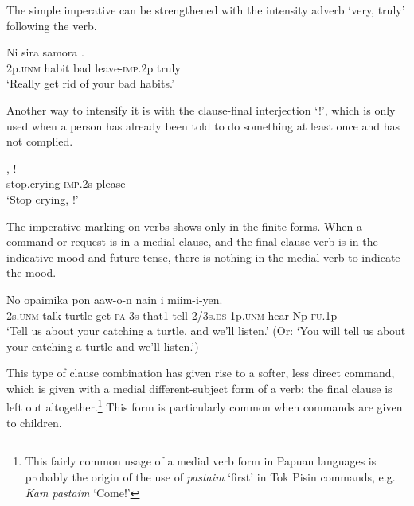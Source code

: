 The simple imperative can be strengthened with the intensity adverb  `very, truly' following the verb.

\ea%
\label{ex:7:x1073}
\gll Ni  sira  samora  .\\ 
2p.\textsc{unm}  habit  bad  leave-\textsc{imp}.2p  truly\\
\glt `Really get rid of your bad habits.'
\z





Another way to intensify it is with the clause-final interjection  `!', which is only used when a person has already been told to do something at least once and has not complied.

\ea%
\label{ex:7:x1074}
\gll {},  ! \\
 stop.crying-\textsc{imp}.2s  please     \\
\glt `Stop crying, !'
\z





The imperative marking on verbs shows only in the finite forms. When a command or request is in a medial clause, and the final clause verb is in the indicative mood and future tense, there is nothing in the medial verb to indicate the mood. 

\ea%
\label{ex:7:x1076}
\gll No  opaimika  pon  aaw-o-n  nain   i  miim-i-yen.\\
2s.\textsc{unm}  talk  turtle  get-\textsc{pa}-3s  that1  tell-2/3s.\textsc{ds} 1p.\textsc{unm}  hear-Np-\textsc{fu}.1p     \\
\glt `Tell us about your catching a turtle, and we'll listen.' (Or: `You will tell us about your catching a turtle and we'll listen.')
\z


This type of clause combination has given rise to a softer, less direct command, which is given with a medial different-subject form of a verb; the final clause is left out altogether.\footnote{This fairly common usage of a medial verb form in Papuan languages is probably the origin of the use of \textit{pastaim} `first' in Tok Pisin commands, e.g. \textit{Kam pastaim} `Come!'}  This form is particularly common when commands are given to children. 

